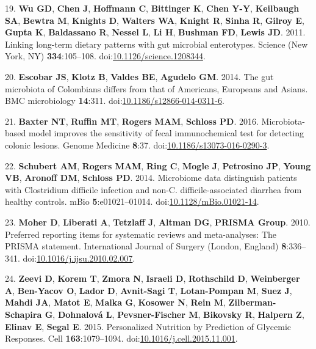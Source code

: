 \documentclass[12pt,]{article}
\begin{document}
\hypertarget{ref-wuux5flinkingux5f2011}{}
19. \textbf{Wu GD}, \textbf{Chen J}, \textbf{Hoffmann C},
\textbf{Bittinger K}, \textbf{Chen Y-Y}, \textbf{Keilbaugh SA},
\textbf{Bewtra M}, \textbf{Knights D}, \textbf{Walters WA},
\textbf{Knight R}, \textbf{Sinha R}, \textbf{Gilroy E}, \textbf{Gupta
K}, \textbf{Baldassano R}, \textbf{Nessel L}, \textbf{Li H},
\textbf{Bushman FD}, \textbf{Lewis JD}. 2011. Linking long-term dietary
patterns with gut microbial enterotypes. Science (New York, NY)
\textbf{334}:105--108.
doi:\href{https://doi.org/10.1126/science.1208344}{10.1126/science.1208344}.

\hypertarget{ref-escobarux5fgutux5f2014}{}
20. \textbf{Escobar JS}, \textbf{Klotz B}, \textbf{Valdes BE},
\textbf{Agudelo GM}. 2014. The gut microbiota of Colombians differs from
that of Americans, Europeans and Asians. BMC microbiology
\textbf{14}:311.
doi:\href{https://doi.org/10.1186/s12866-014-0311-6}{10.1186/s12866-014-0311-6}.

\hypertarget{ref-baxterux5fmicrobiota-basedux5f2016}{}
21. \textbf{Baxter NT}, \textbf{Ruffin MT}, \textbf{Rogers MAM},
\textbf{Schloss PD}. 2016. Microbiota-based model improves the
sensitivity of fecal immunochemical test for detecting colonic lesions.
Genome Medicine \textbf{8}:37.
doi:\href{https://doi.org/10.1186/s13073-016-0290-3}{10.1186/s13073-016-0290-3}.

\hypertarget{ref-schubertux5fmicrobiomeux5f2014}{}
22. \textbf{Schubert AM}, \textbf{Rogers MAM}, \textbf{Ring C},
\textbf{Mogle J}, \textbf{Petrosino JP}, \textbf{Young VB},
\textbf{Aronoff DM}, \textbf{Schloss PD}. 2014. Microbiome data
distinguish patients with Clostridium difficile infection and non-C.
difficile-associated diarrhea from healthy controls. mBio
\textbf{5}:e01021--01014.
doi:\href{https://doi.org/10.1128/mBio.01021-14}{10.1128/mBio.01021-14}.

\hypertarget{ref-moherux5fpreferredux5f2010}{}
23. \textbf{Moher D}, \textbf{Liberati A}, \textbf{Tetzlaff J},
\textbf{Altman DG}, \textbf{PRISMA Group}. 2010. Preferred reporting
items for systematic reviews and meta-analyses: The PRISMA statement.
International Journal of Surgery (London, England) \textbf{8}:336--341.
doi:\href{https://doi.org/10.1016/j.ijsu.2010.02.007}{10.1016/j.ijsu.2010.02.007}.

\hypertarget{ref-zeeviux5fpersonalizedux5f2015}{}
24. \textbf{Zeevi D}, \textbf{Korem T}, \textbf{Zmora N},
\textbf{Israeli D}, \textbf{Rothschild D}, \textbf{Weinberger A},
\textbf{Ben-Yacov O}, \textbf{Lador D}, \textbf{Avnit-Sagi T},
\textbf{Lotan-Pompan M}, \textbf{Suez J}, \textbf{Mahdi JA},
\textbf{Matot E}, \textbf{Malka G}, \textbf{Kosower N}, \textbf{Rein M},
\textbf{Zilberman-Schapira G}, \textbf{Dohnalová L},
\textbf{Pevsner-Fischer M}, \textbf{Bikovsky R}, \textbf{Halpern Z},
\textbf{Elinav E}, \textbf{Segal E}. 2015. Personalized Nutrition by
Prediction of Glycemic Responses. Cell \textbf{163}:1079--1094.
doi:\href{https://doi.org/10.1016/j.cell.2015.11.001}{10.1016/j.cell.2015.11.001}.
\end{document}
